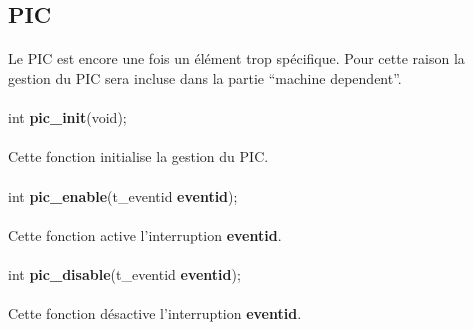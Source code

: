 \documentclass[10pt,a4wide]{article}
\begin{document}
\subsection{PIC}

\paragraph{}

Le PIC est encore une fois un \'el\'ement trop sp\'ecifique. Pour cette
raison la gestion du PIC sera incluse dans la partie ``machine dependent''.

\paragraph{}

\hspace{1.5cm}int \textbf{pic\_init}(void);

\paragraph{}

Cette fonction initialise la gestion du PIC.

\paragraph{}

\hspace{1.5cm}int \textbf{pic\_enable}(t\_eventid \textbf{eventid});

\paragraph{}

Cette fonction active l'interruption \textbf{eventid}.

\paragraph{}

\hspace{1.5cm}int \textbf{pic\_disable}(t\_eventid \textbf{eventid});

\paragraph{}

Cette fonction d\'esactive l'interruption \textbf{eventid}.
\end{document}
